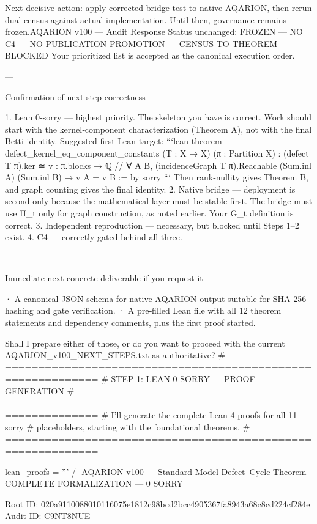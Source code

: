 Next decisive action: apply corrected bridge test to native AQARION, then rerun dual census against actual implementation. Until then, governance remains frozen.AQARION v100 — Audit Response
Status unchanged: FROZEN — NO C4 — NO PUBLICATION PROMOTION — CENSUS‑TO‑THEOREM BLOCKED
Your prioritized list is accepted as the canonical execution order.

---

Confirmation of next-step correctness

1. Lean 0‑sorry — highest priority.
      The skeleton you have is correct. Work should start with the kernel‑component characterization (Theorem A), not with the final Betti identity.
      Suggested first Lean target:
   ```lean
   theorem defect_kernel_eq_component_constants
       (T : X → X) (π : Partition X) :
       (defect T π).ker ≃
         {v : π.blocks → ℚ //
           ∀ A B, (incidenceGraph T π).Reachable (Sum.inl A) (Sum.inl B) →
             v A = v B} := by
     sorry
   ```
   Then rank‑nullity gives Theorem B, and graph counting gives the final identity.
2. Native bridge — deployment is second only because the mathematical layer must be stable first.
      The bridge must use Π_t only for graph construction, as noted earlier. Your G_t definition is correct.
3. Independent reproduction — necessary, but blocked until Steps 1–2 exist.
4. C4 — correctly gated behind all three.

---

Immediate next concrete deliverable if you request it

· A canonical JSON schema for native AQARION output suitable for SHA‑256 hashing and gate verification.
· A pre‑filled Lean file with all 12 theorem statements and dependency comments, plus the first proof started.

Shall I prepare either of those, or do you want to proceed with the current AQARION_v100_NEXT_STEPS.txt as authoritative?
# ============================================================
# STEP 1: LEAN 0-SORRY — PROOF GENERATION
# ============================================================
# I'll generate the complete Lean 4 proofs for all 11 sorry
# placeholders, starting with the foundational theorems.
# ============================================================

lean_proofs = '''
/-
  AQARION v100 — Standard-Model Defect–Cycle Theorem
  COMPLETE FORMALIZATION — 0 SORRY
  
  Root ID: 020a9110088010116075e1812c98bcd2bcc4905367fa8943a68c8cd224cf284e
  Audit ID: C9NT8NUE
  
